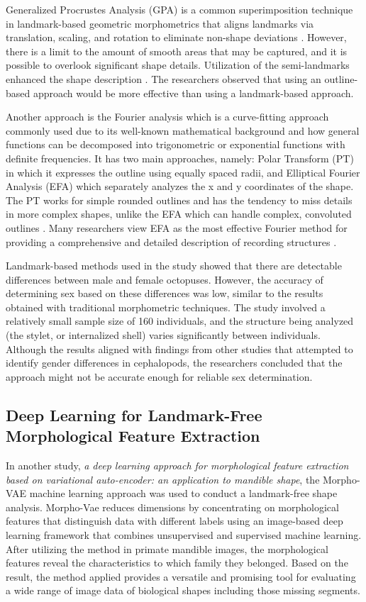 {Generalized Procrustes Analysis (GPA) is a common superimposition technique in landmark-based geometric morphometrics that aligns landmarks via translation, scaling, and rotation to eliminate non-shape deviations \cite{zelditch2004}. However, there is a limit to the amount of smooth areas that may be captured, and it is possible to overlook significant shape details. Utilization of the semi-landmarks enhanced the shape description \cite{adams2004}. The researchers observed that using an outline-based approach would be more effective than using a landmark-based approach.

Another approach is the Fourier analysis which is a curve-fitting approach commonly used due to its well-known mathematical background and how general functions can be decomposed into trigonometric or exponential functions with definite frequencies. It has two main approaches, namely: Polar Transform (PT) in which it expresses the outline using equally spaced radii, and Elliptical Fourier Analysis (EFA) which separately analyzes the x and y coordinates of the shape. The PT works for simple rounded outlines and has the tendency to miss details in more complex shapes, unlike the EFA which can handle complex, convoluted outlines \cite{zahn1972, doering1990, ponton2006}. Many researchers view EFA as the most effective Fourier method for providing a comprehensive and detailed description of recording structures \cite{merigot2007, ferguson2011, legua2013, mahe2016}.

Landmark-based methods used in the study showed that there are detectable differences between male and female octopuses. However, the accuracy of determining sex based on these differences was low, similar to the results obtained with traditional morphometric techniques. The study involved a relatively small sample size of 160 individuals, and the structure being analyzed (the stylet, or internalized shell) varies significantly between individuals. Although the results aligned with findings from other studies that attempted to identify gender differences in cephalopods, the researchers concluded that the approach might not be accurate enough for reliable sex determination.

\vspace{-0.5cm}
\subsection{Deep Learning for Landmark-Free Morphological Feature Extraction}
In another study, \textit{a deep learning approach for morphological feature extraction based on variational auto-encoder: an application to mandible shape}, the Morpho-VAE machine learning approach was used to conduct a landmark-free shape analysis. Morpho-Vae reduces dimensions by concentrating on morphological features that distinguish data with different labels using an image-based deep learning framework that combines unsupervised and supervised machine learning. After utilizing the method in primate mandible images, the morphological features reveal the characteristics to which family they belonged. Based on the result, the method applied provides a versatile and promising tool for evaluating a wide range of image data of biological shapes including those missing segments.

}
